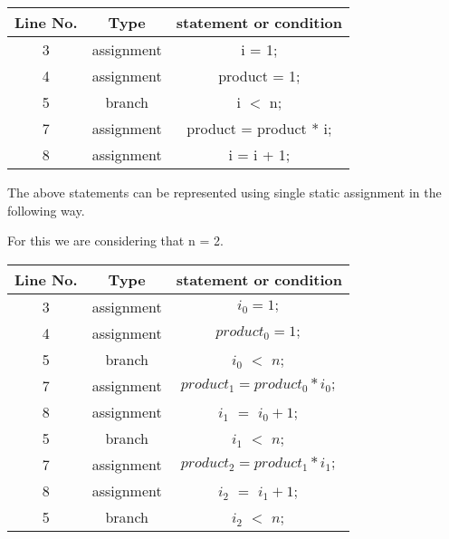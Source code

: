 \begin{center}

\begin{tabular}{|| c | c | c ||}

\hline

Line No. & Type & statement or condition \\ [0.5ex]

\hline

3 & assignment & i = 1; \\


4 & assignment & product = 1; \\


5 & branch & i $<$ n; \\

7 & assignment & product = product * i; \\


8 & assignment & i = i + 1; \\ [1ex]

\hline

\end{tabular}

\end{center}

\noindent

The above statements can be represented using single static assignment in the
following way.

For this we are considering that n = 2.

\begin{center}

\begin{tabular}{|| c | c | c ||}

\hline

Line No. & Type & statement or condition \\ [0.5ex]

\hline

3 & assignment & $ i_0 = 1; $ \\


4 & assignment & $ product_0 = 1; $ \\


5 & branch & $ i_0 $ $<$ $ n ;$ \\

7 & assignment & $product_1 = product_0 * i_0; $ \\


8 & assignment & $ i_1 $ $=$ $ i_0 + 1; $ \\

5 & branch & $ i_1 $ $<$ $ n ;$ \\

7 & assignment & $product_2 = product_1 * i_1; $ \\


8 & assignment & $ i_2 $ $=$ $ i_1 + 1; $ \\

5 & branch & $ i_2 $ $<$ $ n ;$ \\ [1ex]

\hline

\end{tabular}

\end{center}

